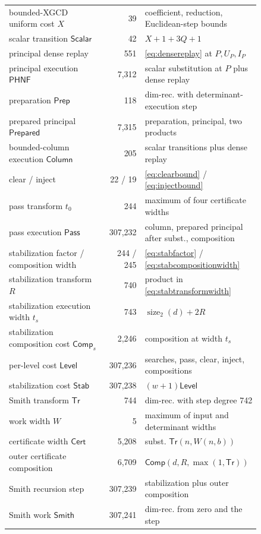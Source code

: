 \documentclass[11pt]{article}
\theoremstyle{definition}
\newcommand{\natsize}{\operatorname{size}_2}
\begin{document}
\begin{longtable}{@{}p{0.38\linewidth}r p{0.46\linewidth}@{}}
bounded-XGCD uniform cost $X$ & 39 & coefficient, reduction, Euclidean-step bounds \\
scalar transition $\mathsf{Scalar}$ & 42 & $X+1+3Q+1$ \\
principal dense replay & 551 & \eqref{eq:densereplay} at $P,U_P,I_P$ \\
principal execution $\mathsf{PHNF}$ & 7,312 & scalar substitution at $P$ plus dense replay \\
preparation $\mathsf{Prep}$ & 118 & dim-rec. with determinant-execution step \\
prepared principal $\mathsf{Prepared}$ & 7,315 & preparation, principal, two products \\
bounded-column execution $\mathsf{Column}$ & 205 & scalar transitions plus dense replay \\
clear / inject & 22 / 19 & \eqref{eq:clearbound} / \eqref{eq:injectbound} \\
pass transform $t_0$ & 244 & maximum of four certificate widths \\
pass execution $\mathsf{Pass}$ & 307,232 & column, prepared principal after subst., composition \\
stabilization factor / composition width & 244 / 245 & \eqref{eq:stabfactor} / \eqref{eq:stabcompositionwidth} \\
stabilization transform $R$ & 740 & product in \eqref{eq:stabtransformwidth} \\
stabilization execution width $t_s$ & 743 & $\natsize(d)+2R$ \\
stabilization composition cost $\mathsf{Comp}_s$ & 2,246 & composition at width $t_s$ \\
per-level cost $\mathsf{Level}$ & 307,236 & searches, pass, clear, inject, compositions \\
stabilization cost $\mathsf{Stab}$ & 307,238 & $(w+1)\mathsf{Level}$ \\
Smith transform $\mathsf{Tr}$ & 744 & dim-rec. with step degree 742 \\
work width $W$ & 5 & maximum of input and determinant widths \\
certificate width $\mathsf{Cert}$ & 5,208 & subst. $\mathsf{Tr}(n,W(n,b))$ \\
outer certificate composition & 6,709 & $\mathsf{Comp}(d,R,\max(1,\mathsf{Tr}))$ \\
Smith recursion step & 307,239 & stabilization plus outer composition \\
Smith work $\mathsf{Smith}$ & 307,241 & dim-rec. from zero and the step \\

\end{longtable}
\end{document}
